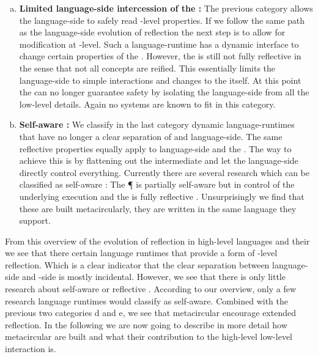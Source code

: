 \begin{enumerate}[a)]
\item \textbf{Limited language-side intercession of the \VM:}
	The previous category allows the language-side to safely read \VM-level properties.
	If we follow the same path as the language-side evolution of reflection the next step is to allow for modification at \VM-level.
	Such a language-runtime has a dynamic interface to change certain properties of the \VM.
	However, the \VM is still not fully reflective in the sense that not all \VM concepts are reified.
	This essentially limits the language-side to simple interactions and changes to the \VM itself.
	At this point the \VM can no longer guarantee safety by isolating the language-side from all the low-level details.
	Again no systems are known to fit in this category.
	
\item \textbf{Self-aware \VM:}
	We classify in the last category dynamic language-runtimes that have no longer a clear separation of \VM and language-side.
	The same reflective properties equally apply to language-side and the \VM.
	The way to achieve this is by flattening out the intermediate \VM and let the language-side directly control everything.
	Currently there are several research \VMs which can be classified as self-aware \VMs: The \P \VM \cite{Verw12a} is partially self-aware but in control of the underlying execution and the \Klein \VM is fully reflective \cite{Unga05a}. 
	Unsurprisingly we find that these \VMs are built metacircularly, they are written in the same language they support.
\end{enumerate}

From this overview of the evolution of reflection in high-level languages and their \VMs we see that there certain language runtimes that provide a form of \VM-level reflection.
Which is a clear indicator that the clear separation between language-side and \VM-side is mostly incidental.
However, we see that there is only little research about self-aware \VMs or reflective \VMs.
According to our overview, only a few research language runtimes would classify as self-aware.
Combined with the previous two categories d and e, we see that metacircular \VMs encourage extended reflection.
In the following  we are now going to describe in more detail how metacircular \VMs are built and what their contribution to the high-level low-level interaction is.



